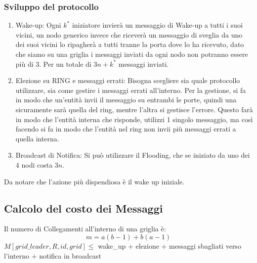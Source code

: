 \subsubsection{Sviluppo del protocollo}
\begin{enumerate}
    \item Wake-up: Ogni $k^*$ iniziatore invierà un messaggio di Wake-up a tutti i
          suoi vicini, un nodo generico invece che riceverà un messaggio di sveglia da
          uno dei suoi vicini lo ripagherà a tutti tranne la porta dove lo ha ricevuto,
          dato che siamo su una griglia i messaggi inviati da ogni nodo non potranno
          essere più di 3. Per un totale di $3n +k^*$ messaggi inviati.
    \item Elezione su RING e messaggi errati: Bisogna scegliere sia quale
          protocollo utilizzare, sia come gestire i messaggi errati all'interno. Per la
          gestione, si fa in modo che un'entità invii il messaggio su entrambi le porte,
          quindi una sicuramente sarà quella del ring, mentre l'altra si gestisce
          l'errore. Questo farà in modo che l'entità interna che risponde, utilizzi 1
          singolo messaggio, ma così facendo si fa in modo che l'entità nel ring non
          invii più messaggi errati a quella interna.
    \item Broadcast di Notifica: Si può utilizzare il Flooding, che se iniziato da
          uno dei 4 nodi costa $3n$.
\end{enumerate}
Da notare che l'azione più dispendiosa è il wake up iniziale.

\subsection{Calcolo del costo dei Messaggi}
Il numero di Collegamenti all'interno di una griglia è:
$$m=a(b-1)+b(a-1)$$ $M[grid\_leader,R,id,grid] \leq $ wake\_up + elezione +
messaggi sbagliati verso l'interno + notifica in broadcast\\

